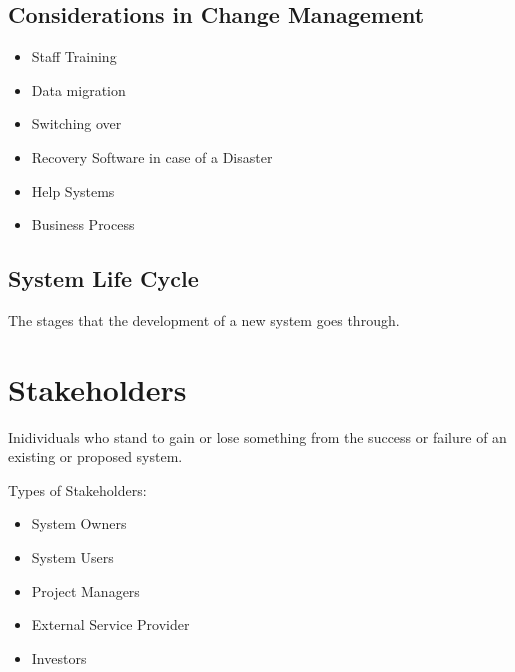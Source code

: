 \documentclass[12pt,fleqn]{book} %
\begin{document}
\subsection{Considerations in Change Management}
\begin{itemize}
  \item Staff Training
  \item Data migration
  \item Switching over
  \item Recovery Software in case of a Disaster
  \item Help Systems
  \item Business Process
\end{itemize}

\subsection{System Life Cycle}
\begin{definition}
  The stages that the development of a new system goes through.
\end{definition}\par

\begin{center}
\end{center}

\section{Stakeholders}
\begin{definition}[Stakeholder]
  Inidividuals who stand to gain or lose something from the success or failure
  of an existing or proposed system.
\end{definition}\par

\begin{example}
  Types of Stakeholders:
  \begin{itemize}
    \item System Owners
    \item System Users
    \item Project Managers
    \item External Service Provider
    \item Investors
  \end{itemize}
\end{example}
\end{document}
